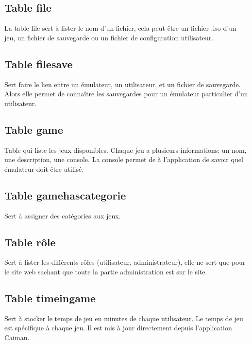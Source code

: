 \documentclass[a4paper,12pt,french]{sphinxmanual}
\begin{document}
\subsection{Table file}
\label{\detokenize{fonctionnelleBDD:table-file}}
\sphinxAtStartPar
La table file sert à lister le nom d’un fichier, cela peut être un fichier .iso d’un jeu, un fichier de sauvegarde ou un fichier de configuration utilisateur.


\subsection{Table filesave}
\label{\detokenize{fonctionnelleBDD:table-filesave}}
\sphinxAtStartPar
Sert  faire le lien entre un émulateur, un utilisateur, et un fichier de sauvegarde. Alors elle permet de connaître les sauvegardes pour un émulateur particulier d’un utilisateur.


\subsection{Table game}
\label{\detokenize{fonctionnelleBDD:table-game}}
\sphinxAtStartPar
Table qui liste les jeux disponibles. Chaque jeu a plusieurs informations: un nom, une description, une console. La console permet de à l’application de savoir quel émulateur doit être utilisé.


\subsection{Table gamehascategorie}
\label{\detokenize{fonctionnelleBDD:table-gamehascategorie}}
\sphinxAtStartPar
Sert à assigner des catégories aux jeux.


\subsection{Table rôle}
\label{\detokenize{fonctionnelleBDD:table-role}}
\sphinxAtStartPar
Sert à lister les différents rôles (utilisateur, administrateur), elle ne sert que pour le site web sachant que toute la partie administration est sur le site.


\subsection{Table timeingame}
\label{\detokenize{fonctionnelleBDD:table-timeingame}}
\sphinxAtStartPar
Sert à stocker le temps de jeu en minutes de chaque utilisateur. Le temps de jeu est spécifique à chaque jeu. Il est mis à jour directement depuis l’application Caiman.
\end{document}
